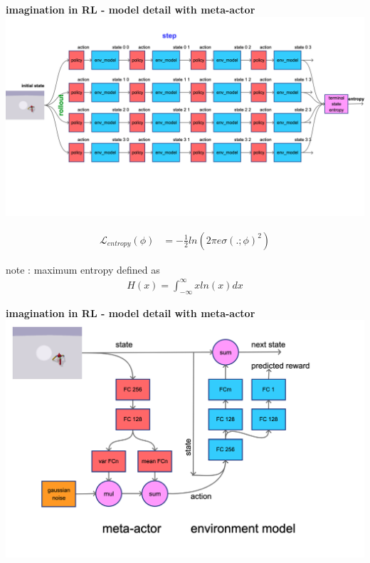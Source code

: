 \documentclass[xcolor=dvipsnames]{beamer}
\begin{document}
\begin{frame}{\bf imagination in RL - model detail with meta-actor}
  {\centering \includegraphics[scale=0.08]{../diagrams/imaginationentropy.png}}

  \begin{align*}
    \mathcal{L}_{entropy}(\phi) &= -\frac{1}{2} ln(2\pi e \sigma(.;\phi)^2)
  \end{align*}


  note : maximum entropy defined as
    \begin{align*}
      H(x) = \int_{-\infty}^{\infty} x ln(x)dx
    \end{align*}
\end{frame}



\begin{frame}{\bf imagination in RL - model detail with meta-actor}
  {\centering \includegraphics[scale=0.1]{../diagrams/imaginationmodeldetail.png}}
\end{frame}
\end{document}
